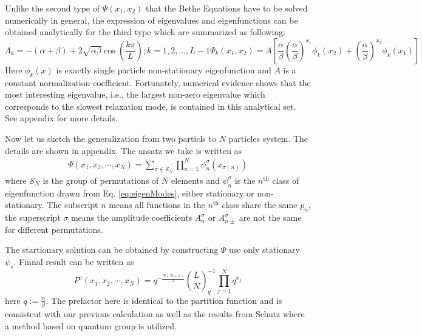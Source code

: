 \documentclass[aps,showpacs,twocolumn,floatfix,prx,superscriptaddress]{revtex4-1}
\begin{document}
Unlike the second type of $\Psi(x_1, x_2)$ that the Bethe Equations have to be solved numerically in general, the expression of eigenvalues and eigenfunctions can be obtained analytically for the third type which are summarized as following:
\begin{subequations}
    \label{eq:eigenTwo}
    \begin{equation}
        \label{eq:eigenvaluesTwo}
        \Lambda_k  = -(\alpha+\beta) + 2\sqrt{\alpha\beta}\cos(\frac{k\pi}{L});
        k=1,2,\dots, L-1
    \end{equation}
    \begin{equation}
        \label{eq:eigenvectorsTwo}
        \Psi_k(x_1, x_2)  =  A\left[ \frac{\alpha}{\beta}
            \left(\frac{\alpha}{\beta}
            \right)^{x_1}\phi_k(x_2)+\left(\frac{\alpha}{\beta}\right)^{x_2}
            \phi_k(x_1) \right]
    \end{equation}
\end{subequations}
Here $\phi_k(x)$ is exactly single particle non-stationary eigenfunction and
$A$ is a constant normalization coefficient. Fortunately, numerical evidence shows that the most interesting eigenvalue, i.e., the largest non-zero eigenvalue which corresponds to the slowest relaxation mode, is contained in this analytical set. See appendix for more details.

Now let us sketch the generalization from two particls to $N$ particles system. The details are shown in appendix. The ansatz we take is written as
\begin{equation}
    \label{eq:ansatzN}
    \begin{aligned}
        \Psi(x_1, x_2, \cdots, x_N) = \sum_{\sigma\in \mathcal{S}_N}
        \prod_{n=1}^N \psi_n^{\sigma}(x_{\sigma(n)})
    \end{aligned}
\end{equation}
where $\mathcal{S}_N$ is the group of permutations of $N$ elements and $\psi_n^{\sigma}$ is the $n^{\text{th}}$ class of eigenfunction drawn from Eq.  \eqref{eq:eigenModes}, either stationary or non-stationary. The subscript $n$ means all functions in the $n^{\text{th}}$ class share the same $p_n$, the superscript $\sigma$ means the amplitude coefficients $A_n^{\sigma}$ or $A_{n\pm}^{\sigma}$ are not the same for different permutations.

The startionary solution can be obtained by constructing $\Psi$ use only stationary $\psi_s$. Finnal result can be written as 
\begin{equation}
    \label{eq:stationarySolutionN}
    P^e(x_1, x_2, \cdots, x_N) = q^{-\frac{N(N+1)}{2}}
    \binom{L}{N}_q^{-1}\prod_{j=1}^N{q^{x_j}}
\end{equation}
here $q:=\frac{\alpha}{\beta}$. The prefactor here is identical to the partition function and is consistent with our previous calculation as well as the results from Schutz\cite{} where a method based on quantum group is utilized.
\end{document}
